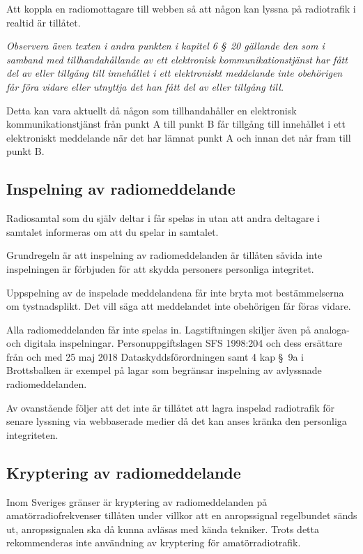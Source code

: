 Att koppla en radiomottagare till webben så att någon kan lyssna på radiotrafik
i realtid är tillåtet.

\emph{Observera även texten i andra punkten i kapitel 6 \S~20 gällande den som i
	samband med tillhandahållande av ett elektronisk kommunikationstjänst har fått
	del av eller tillgång till innehållet i ett elektroniskt meddelande inte
	obehörigen får föra vidare eller utnyttja det han fått del av eller tillgång
	till.}

Detta kan vara aktuellt då någon som tillhandahåller en elektronisk
kommunikationstjänst från punkt A till punkt B får tillgång till innehållet i
ett elektroniskt meddelande när det har lämnat punkt A och innan det når fram
till punkt B.

\subsection{Inspelning av radiomeddelande}

Radiosamtal som du själv deltar i får spelas in utan att andra deltagare i
samtalet informeras om att du spelar in samtalet.

Grundregeln är att inspelning av radiomeddelanden är tillåten såvida inte
inspelningen är förbjuden för att skydda personers personliga integritet.

Uppspelning av de inspelade meddelandena får inte bryta mot bestämmelserna om
tystnadsplikt.
Det vill säga att meddelandet inte obehörigen får föras vidare.

Alla radiomeddelanden får inte spelas in.
Lagstiftningen skiljer även på analoga- och digitala inspelningar.
Personuppgiftslagen SFS 1998:204 \cite{SFS1998:204} och dess ersättare från och
med 25 maj 2018 Dataskyddsförordningen \cite{GDPR} samt 4 kap \S~9a i
Brottsbalken \cite{SFS1962:700} är exempel på lagar som begränsar inspelning av
avlyssnade radiomeddelanden.

Av ovanstående följer att det inte är tillåtet att lagra inspelad radiotrafik
för senare lyssning via webbaserade medier då det kan anses kränka den
personliga integriteten.

\subsection{Kryptering av radiomeddelande}

Inom Sveriges gränser är kryptering av radiomeddelanden på amatörradiofrekvenser
tillåten under villkor att en anropssignal regelbundet sänds ut, anropssignalen
ska då kunna avläsas med kända tekniker.
Trots detta rekommenderas inte användning av kryptering för amatörradiotrafik.


